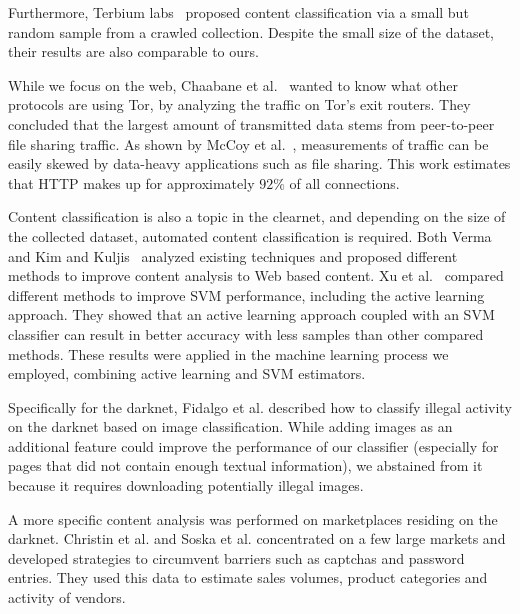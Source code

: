 Furthermore, Terbium labs~\cite{ClareGollnick2016} proposed content classification via a small but random sample from a crawled collection. Despite the small size of the dataset, their results are also comparable to ours.

While we focus on the web, Chaabane et al.~\cite{Chaabane2010} wanted to know what other protocols are using Tor, by analyzing the traffic on Tor's exit routers. They concluded that the largest amount of transmitted data stems from peer-to-peer file sharing traffic. As shown by McCoy et al.~\cite{McCoy2008}, measurements of traffic can be easily skewed by data-heavy applications such as file sharing. This work estimates that HTTP makes up for approximately $92\%$ of all connections. 

Content classification is also a topic in the clearnet, and depending on the size of the collected dataset, automated content classification is required. 
Both Verma~\cite{Verma2013} and Kim and Kuljis~\cite{Kim2010} analyzed existing techniques and proposed different methods to improve content analysis to Web based content. Xu et al.~\cite{Xu2009} compared different methods to improve SVM performance, including the active learning approach. They showed that an active learning approach coupled with an SVM classifier can result in better accuracy with less samples than other compared methods. These results were applied in the machine learning process we employed, combining active learning and SVM estimators.

Specifically for the darknet, Fidalgo et al. \cite{Fidalgo2017} described how to classify illegal activity on the darknet based on image classification. While adding images as an additional feature could improve the performance of our classifier (especially for pages that did not contain enough textual information), we abstained from it because  it requires downloading potentially illegal images.


A more specific content analysis was performed on marketplaces residing on the darknet. Christin et al. \cite{Christin2013} and Soska et al. \cite{KyleSoska2015} concentrated on a few large markets and developed strategies to circumvent barriers such as captchas and password entries. They used this data to estimate sales volumes, product categories and activity of vendors.


